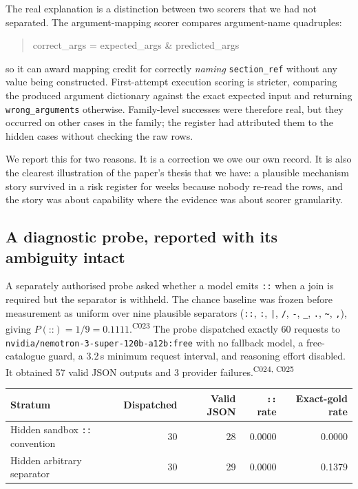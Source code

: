 \documentclass[11pt]{article}
\newcommand{\ledger}[1]{\textsuperscript{\textsf{\scriptsize #1}}}
\begin{document}
The real explanation is a distinction between two scorers that we had not
separated. The argument-mapping scorer compares argument-name quadruples:
\begin{quote}\ttfamily\footnotesize
correct\_args = expected\_args \& predicted\_args
\end{quote}
so it can award mapping credit for correctly \emph{naming} \texttt{section\_ref}
without any value being constructed. First-attempt execution scoring is
stricter, comparing the produced argument dictionary against the exact
expected input and returning \texttt{wrong\_arguments} otherwise. Family-level
successes were therefore real, but they occurred on other cases in the family;
the register had attributed them to the hidden cases without checking the raw
rows.

We report this for two reasons. It is a correction we owe our own record. It
is also the clearest illustration of the paper's thesis that we have: a
plausible mechanism story survived in a risk register for weeks because
nobody re-read the rows, and the story was about capability where the evidence
was about scorer granularity.

\subsection{A diagnostic probe, reported with its ambiguity intact}
\label{sec:probe}

A separately authorised probe asked whether a model emits \texttt{::} when a
join is required but the separator is withheld. The chance baseline was frozen
before measurement as uniform over nine plausible separators
(\texttt{::}, \texttt{:}, \texttt{|}, \texttt{/}, \texttt{-}, \texttt{\_},
\texttt{.}, \texttt{\~{}}, \texttt{,}), giving
$P(\texttt{::}) = 1/9 = 0.1111$.\ledger{C023} The probe dispatched exactly 60
requests to \texttt{nvidia/nemotron-3-super-120b-a12b:free} with no fallback
model, a free-catalogue guard, a 3.2\,s minimum request interval, and
reasoning effort disabled. It obtained 57 valid JSON outputs and 3 provider
failures.\ledger{C024, C025}

\begin{center}
\small
\begin{tabular}{@{}lrrrr@{}}
\toprule
Stratum & Dispatched & Valid JSON & \texttt{::} rate & Exact-gold rate \\
\midrule
Hidden sandbox \texttt{::} convention & 30 & 28 & 0.0000 & 0.0000 \\
Hidden arbitrary separator            & 30 & 29 & 0.0000 & 0.1379 \\
\bottomrule
\end{tabular}
\end{center}
\end{document}

